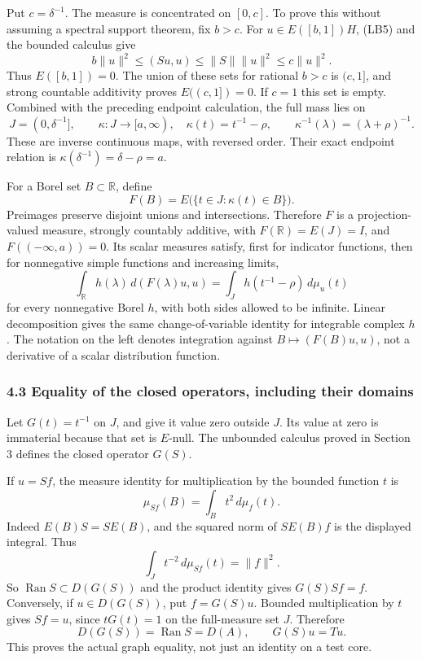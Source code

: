 \documentclass[
  11pt,
]{article}
\begin{document}
Put \(c=\delta^{-1}\). The measure is concentrated on \([0,c]\). To
prove this without assuming a spectral support theorem, fix \(b>c\). For
\(u\in E([b,1])H\), (LB5) and the bounded calculus give \[
 b\|u\|^2\leq(Su,u)\leq\|S\|\|u\|^2\leq c\|u\|^2.
\] Thus \(E([b,1])=0\). The union of these sets for rational \(b>c\) is
\((c,1]\), and strong countable additivity proves \(E((c,1])=0\). If
\(c=1\) this set is empty. Combined with the preceding endpoint
calculation, the full mass lies on \[
 J=(0,\delta^{-1}],\qquad
 \kappa:J\longrightarrow[a,\infty),\quad
 \kappa(t)=t^{-1}-\rho,\qquad
 \kappa^{-1}(\lambda)=(\lambda+\rho)^{-1}.
 \tag{LB6}
\] These are inverse continuous maps, with reversed order. Their exact
endpoint relation is \(\kappa(\delta^{-1})=\delta-\rho=a\).

For a Borel set \(B\subset\mathbb R\), define \[
 F(B)=E\bigl(\{t\in J:\kappa(t)\in B\}\bigr).
 \tag{LB7}
\] Preimages preserve disjoint unions and intersections. Therefore \(F\)
is a projection-valued measure, strongly countably additive, with
\(F(\mathbb R)=E(J)=I\), and \(F((-\infty,a))=0\). Its scalar measures
satisfy, first for indicator functions, then for nonnegative simple
functions and increasing limits, \[
 \int_{\mathbb R}h(\lambda)\,d(F(\lambda)u,u)
   =\int_J h(t^{-1}-\rho)\,d\mu_u(t)
 \tag{LB8}
\] for every nonnegative Borel \(h\), with both sides allowed to be
infinite. Linear decomposition gives the same change-of-variable
identity for integrable complex \(h\). The notation on the left denotes
integration against \(B\mapsto(F(B)u,u)\), not a derivative of a scalar
distribution function.

\subsubsection{4.3 Equality of the closed operators, including their
domains}\label{equality-of-the-closed-operators-including-their-domains}

Let \(G(t)=t^{-1}\) on \(J\), and give it value zero outside \(J\). Its
value at zero is immaterial because that set is \(E\)-null. The
unbounded calculus proved in Section 3 defines the closed operator
\(G(S)\).

If \(u=Sf\), the measure identity for multiplication by the bounded
function \(t\) is \[
 \mu_{Sf}(B)=\int_B t^2\,d\mu_f(t).
 \tag{LB9}
\] Indeed \(E(B)S=SE(B)\), and the squared norm of \(SE(B)f\) is the
displayed integral. Thus \[
 \int_J t^{-2}\,d\mu_{Sf}(t)=\|f\|^2.
 \tag{LB10}
\] So \(\operatorname{Ran}S\subset D(G(S))\) and the product identity
gives \(G(S)Sf=f\). Conversely, if \(u\in D(G(S))\), put \(f=G(S)u\).
Bounded multiplication by \(t\) gives \(Sf=u\), since \(tG(t)=1\) on the
full-measure set \(J\). Therefore \[
 D(G(S))=\operatorname{Ran}S=D(A),\qquad
 G(S)u=Tu.
 \tag{LB11}
\] This proves the actual graph equality, not just an identity on a test
core.
\end{document}
